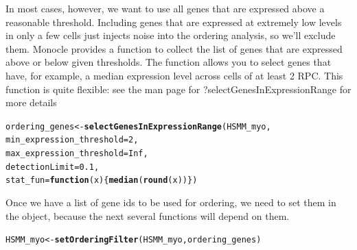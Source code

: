 \documentclass[10pt,oneside]{article}\usepackage[]{graphicx}\usepackage[]{color}
\makeatletter
\newcommand{\hlnum}[1]{\textcolor[rgb]{0.686,0.059,0.569}{#1}}%
\newcommand{\hlstd}[1]{\textcolor[rgb]{0.345,0.345,0.345}{#1}}%
\newcommand{\hlkwa}[1]{\textcolor[rgb]{0.161,0.373,0.58}{\textbf{#1}}}%
\newcommand{\hlkwb}[1]{\textcolor[rgb]{0.69,0.353,0.396}{#1}}%
\newcommand{\hlkwc}[1]{\textcolor[rgb]{0.333,0.667,0.333}{#1}}%
\newcommand{\hlkwd}[1]{\textcolor[rgb]{0.737,0.353,0.396}{\textbf{#1}}}%
\newenvironment{kframe}{%
 \def\at@end@of@kframe{}%
 \ifinner\ifhmode%
  \def\at@end@of@kframe{\end{minipage}}%
  \begin{minipage}{\columnwidth}%
 \fi\fi%
 \def\FrameCommand##1{\hskip\@totalleftmargin \hskip-\fboxsep
 \colorbox{shadecolor}{##1}\hskip-\fboxsep
     \hskip-\linewidth \hskip-\@totalleftmargin \hskip\columnwidth}%
 \MakeFramed {\advance\hsize-\width
   \@totalleftmargin\z@ \linewidth\hsize
   \@setminipage}}%
 {\par\unskip\endMakeFramed%
 \at@end@of@kframe}
\newenvironment{knitrout}{}{} %
\makeatother
\begin{document}
In most cases, however, we want to use all genes that are expressed above a reasonable threshold. Including genes that are expressed at extremely low levels in only a few cells just injects noise into the ordering analysis, so we'll exclude them. Monocle provides a function to collect the list of genes that are expressed above or below given thresholds. The function  allows you to select genes that have, for example, a median expression level across cells of at least 2 RPC. This function is quite flexible: see the man page for ?selectGenesInExpressionRange for more details

\begin{knitrout}
\color{fgcolor}\begin{kframe}
\begin{alltt}
\hlstd{ordering_genes} \hlkwb{<-} \hlkwd{selectGenesInExpressionRange}\hlstd{(HSMM_myo,}
                                               \hlkwc{min_expression_threshold}\hlstd{=}\hlnum{2}\hlstd{,}
                                               \hlkwc{max_expression_threshold}\hlstd{=}\hlnum{Inf}\hlstd{,}
                                               \hlkwc{detectionLimit}\hlstd{=}\hlnum{0.1}\hlstd{,}
                                               \hlkwc{stat_fun}\hlstd{=}\hlkwa{function}\hlstd{(}\hlkwc{x}\hlstd{) \{} \hlkwd{median}\hlstd{(}\hlkwd{round}\hlstd{(x)) \})}
\end{alltt}
\end{kframe}
\end{knitrout}

Once we have a list of gene ids to be used for ordering, we need to set them in the  object, because the next several functions will depend on them.

\begin{knitrout}
\color{fgcolor}\begin{kframe}
\begin{alltt}
\hlstd{HSMM_myo} \hlkwb{<-} \hlkwd{setOrderingFilter}\hlstd{(HSMM_myo, ordering_genes)}
\end{alltt}
\end{kframe}
\end{knitrout}
\end{document}
